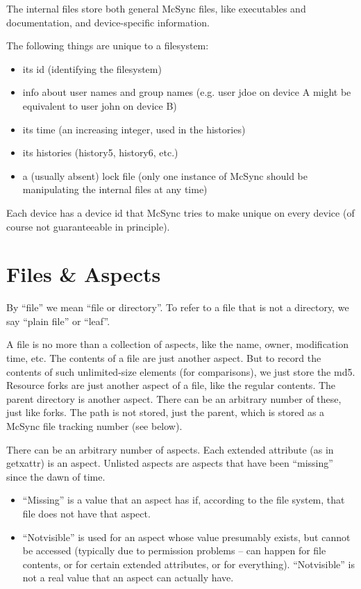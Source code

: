 \documentclass{book}
\begin{document}
The internal files store both general McSync files, like executables and documentation, and device-specific information.

The following things are unique to a filesystem:
\begin{itemize}
\item its id (identifying the filesystem)
\item info about user names and group names (e.g. user jdoe on device A might be equivalent to user john on device B)
\item its time (an increasing integer, used in the histories)
\item its histories (history5, history6, etc.)
\item a (usually absent) lock file (only one instance of McSync should be manipulating the internal files at any time)
\end{itemize}

Each device has a device id that McSync tries to make unique on every device (of course not guaranteeable in principle).


\section{Files \& Aspects}

By ``file'' we mean ``file or directory''.
To refer to a file that is not a directory, we say ``plain file'' or ``leaf''.

A file is no more than a collection of aspects, like the name, owner, modification time, etc.
The contents of a file are just another aspect.  But to record the contents of such unlimited-size elements (for comparisons), we just store the md5.
Resource forks are just another aspect of a file, like the regular contents.
The parent directory is another aspect.  There can be an arbitrary number of these, just like forks.  The path is not stored, just the parent, which is stored as a McSync file tracking number (see below).

There can be an arbitrary number of aspects.  Each extended attribute (as in getxattr) is an aspect.  Unlisted aspects are aspects that have been ``missing'' since the dawn of time.

\begin{itemize}
\item ``Missing'' is a value that an aspect has if, according to the file system, that file does not have that aspect.
\item ``Notvisible'' is used for an aspect whose value presumably exists, but cannot be accessed (typically due to permission problems -- can happen for file contents, or for certain extended attributes, or for everything).  ``Notvisible'' is not a real value that an aspect can actually have.
\end{itemize}
\end{document}
